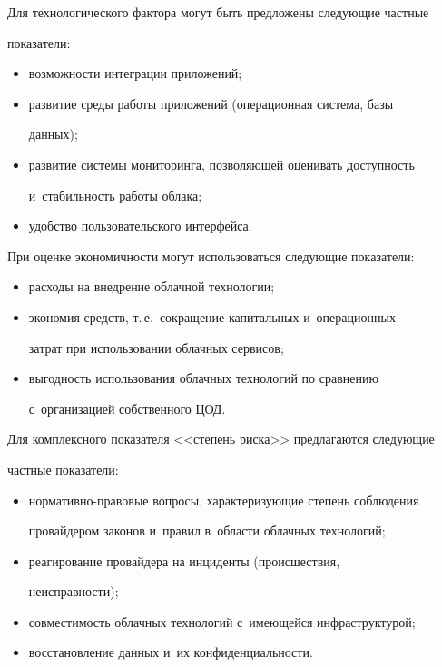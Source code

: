   

  Для технологического фактора могут быть предложены следующие частные 

показатели:

  \begin{itemize}

  \item возможности интеграции приложений;

  \item развитие среды работы приложений (операционная система, базы 

данных);

  \item развитие системы мониторинга, позволяющей оценивать доступность 

и~стабильность работы облака; 

  \item удобство пользовательского интерфейса.

  \end{itemize}

  

  При оценке экономичности могут использоваться следующие показатели:

  \begin{itemize}

  \item расходы на внедрение облачной технологии;

  \item экономия средств, т.\,е.\ сокращение капитальных и~операционных 

затрат при использовании облачных сервисов;

  \item выгодность использования облачных технологий по сравнению 

  с~организацией собственного ЦОД. 

  \end{itemize}

  

  Для комплексного показателя <<степень риска>> предлагаются следующие 

частные показатели:

  \begin{itemize}

  \item нормативно-правовые вопросы, характеризующие степень соблюдения 

провайдером законов и~правил в~области облачных технологий;

  \item реагирование провайдера на инциденты (происшествия, 

неисправности);

  \item совместимость облачных технологий с~имеющейся инфраструктурой;

  \item восстановление данных и~их конфиденциальности. 

  \end{itemize}

